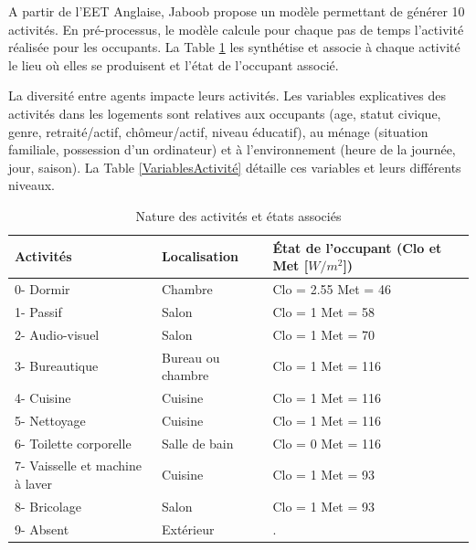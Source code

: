 A partir de l'EET Anglaise, Jaboob \cite{Jaboob-16} propose un modèle permettant de générer 10 activités. En pré-processus, le modèle calcule pour chaque pas de temps l'activité réalisée pour les occupants. La Table \ref{tab:Activités} les synthétise et associe à chaque activité le lieu où elles se produisent et l'état de l'occupant associé.

La diversité entre agents impacte leurs activités. Les variables explicatives des activités dans les logements sont relatives aux occupants (age, statut civique, genre, retraité/actif, chômeur/actif, niveau éducatif), au ménage (situation familiale, possession d'un ordinateur) et à l'environnement (heure de la journée, jour, saison). La Table \ref{VariablesActivité} détaille ces variables et leurs différents niveaux.

\begin{table} [H]
\centering
\begin{tabular}{|p{5 cm}||p{5 cm}|p{5 cm}|}
\hline Activités & Localisation & État de l'occupant (Clo et Met [$W/m^{2}$]) \\
\hline
\hline 0- Dormir & Chambre & Clo = 2.55 \newline Met = 46 \\
\hline 1- Passif & Salon & Clo = 1 \newline Met = 58 \\
\hline 2- Audio-visuel & Salon & Clo = 1 \newline Met = 70 \\
\hline 3- Bureautique & Bureau ou chambre & Clo = 1 \newline Met = 116 \\
\hline 4- Cuisine & Cuisine & Clo = 1 \newline Met = 116 \\
\hline 5- Nettoyage & Cuisine & Clo = 1 \newline Met = 116 \\
\hline 6- Toilette corporelle & Salle de bain & Clo = 0 \newline Met = 116 \\
\hline 7- Vaisselle et machine à laver & Cuisine & Clo = 1 \newline Met = 93 \\
\hline 8- Bricolage & Salon & Clo = 1 \newline Met = 93 \\
\hline 9- Absent & Extérieur & .  \\
\hline
\end{tabular}
\normalsize
\caption{Nature des activités et états associés}
\label{tab:Activités}
\end{table}

